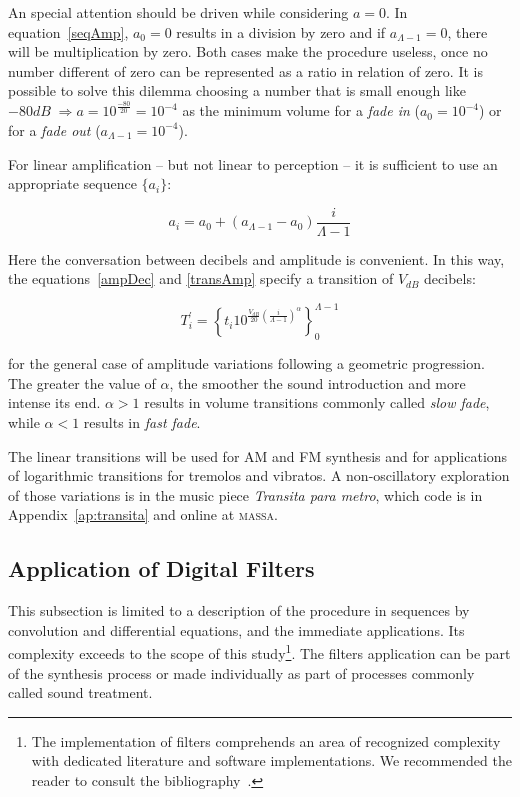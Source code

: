 \documentclass[
 aip,
 jmp,
 amsmath,amssymb,
 reprint,
]{revtex4-1}
\newcommand{\massa}{{\large \textsc{massa}}}
\begin{document}
An special attention should be driven while considering $a=0$.
In equation~\ref{seqAmp}, $a_0=0$ results in a division by zero and if $a_{\Lambda-1}=0$, there will be multiplication by zero. Both cases make the procedure useless, once no number different of zero can be represented as a ratio in relation of zero. It is possible to solve this dilemma choosing a number that is small enough like $-80dB\;\Rightarrow a=10^{\frac{-80}{20}}=10^{-4}$ as the minimum volume for a \emph{fade in} ($a_0=10^{-4}$) or for a \emph{fade out} ($a_{\Lambda-1}=10^{-4}$).

For linear amplification -- but not linear to perception -- it is sufficient to use an appropriate sequence $\{a_i\}$:

\begin{equation}\label{seqAmpLin}
a_i=a_0 + (a_{\Lambda-1}-a_0)\frac{i}{\Lambda-1}
\end{equation}

Here the conversation between decibels and amplitude is convenient. In this way, the equations~\ref{ampDec} and \ref{transAmp} specify a transition of $V_{dB}$ decibels:

\begin{equation}\label{seqAmpDB}
T_i^{'}=\left\{ t_i 10^{\frac{V_{dB}}{20}\left( \frac{i}{\Lambda-1} \right)^\alpha} \right\}_0^{\Lambda-1}
\end{equation}

\noindent for the general case of amplitude variations following a geometric progression. The greater the value of $\alpha$, the smoother the sound introduction and more intense its end. $\alpha>1$ results in volume transitions commonly called \emph{slow fade}, while $\alpha<1$ results in \emph{fast fade}.\cite{guillaume}

The linear transitions will be used for AM and FM synthesis and for applications of logarithmic transitions for tremolos and vibratos. A non-oscillatory exploration of those variations is in the music piece \emph{Transita para metro}, which code is in Appendix~\ref{ap:transita} and online at \massa.\cite{MASSA}


\subsection{Application of Digital Filters}\label{subsec:filtros}

This subsection is limited to a description of the procedure in sequences by convolution and differential equations, and the immediate applications. Its complexity exceeds to the scope of this study\footnote{The implementation of filters comprehends an area of recognized complexity with dedicated literature and software implementations. We recommended the reader to consult the bibliography~\cite{Openheim,smith}.}. The filters application can be part of the synthesis process or made individually as part of processes commonly called sound treatment.
\end{document}
